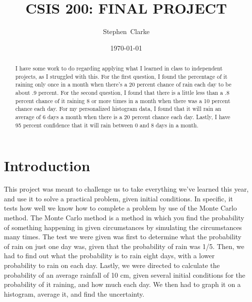 \documentclass[twocolumn]{revtex4}
\begin{document}
\title{
CSIS 200: FINAL PROJECT
}

\author{Stephen~Clarke}


\date{\today}

\begin{abstract}
    
I have some work to do regarding applying what I learned in class to independent projects, as I struggled with this. For the first question, I found the percentage of it raining only once in a month when there's a 20 percent chance of rain each day to be about .9 percent. For the second question, I found that there is a little less than a .8 percent chance of it raining 8 or more times in a month when there was a 10 percent chance each day. For my personalized histogram data, I found that it will rain an average of 6 days a month when there is a 20 percent chance each day. Lastly, I have 95 percent confidence that it will rain between 0 and 8 days in a month.

\end{abstract}

\maketitle

\section{Introduction}
This project was meant to challenge us to take everything we've learned this year, and use it to solve a practical problem, given initial conditions.
In specific, it tests how well we know how to complete a problem by use of the Monte Carlo method. The Monte Carlo method is a method in which you find the probability of something happening in given circumstances by simulating the circumstances many times. The test we were given was first to determine what the probability of rain on just one day was, given that the probability of rain was 1/5. Then, we had to find out what the probability is to rain eight days, with a lower probability to rain on each day. Lastly, we were directed to calculate the probability of an average rainfall of 10 cm, given several initial conditions for the probability of it raining, and how much each day. We then had to graph it on a histogram, average it, and find the uncertainty.
\end{document}

